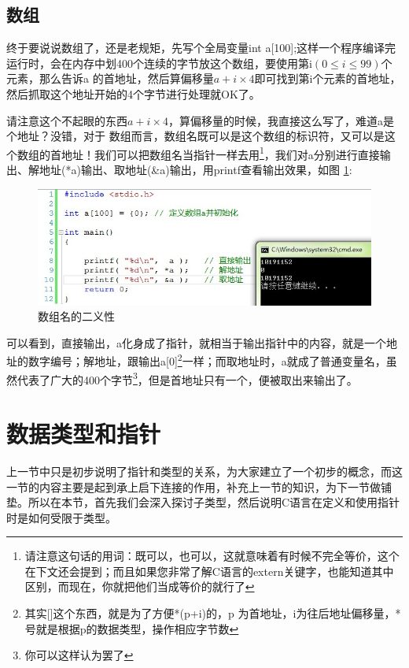 \documentclass[11pt,twoside,a4paper,titlepage]{article}	%
\newcommand{\kw}[1]{\textcolor[rgb]{0.0,0.0,0.63}{ #1}}
\begin{document}
\subsection{数组}
终于要说说数组了，还是老规矩，先写个全局变量int a[100];这样一个程序编译完运行时，会在内存中划400个连续的字节放这个数组，要使用第i$(0\leqslant i \leqslant 99)$个元素，那么告诉a 的首地址，然后算偏移量$a+i\times 4$即可找到第i个元素的首地址，然后抓取这个地址开始的4个字节进行处理就OK了。

请注意这个不起眼的东西$a+i\times 4$，算偏移量的时候，我直接这么写了，难道a是个地址？没错，对于\kw{数组而言，数组名既可以是这个数组的标识符，又可以是这个数组的首地址！我们可以把数组名当指针一样去用}\footnote{请注意这句话的用词：既可以，也可以，这就意味着有时候不完全等价，这个在下文还会提到；而且如果您非常了解C语言的extern关键字，也能知道其中区别，而现在，你就把他们当成等价的就行了}，我们对a分别进行直接输出、解地址(*a)输出、取地址(\&a)输出，用printf查看输出效果，如图 \ref{fig:arryadd_01}:

\begin{figure}[H]
\centering
\includegraphics[scale=.5]{../src/arryadd_01.jpg}
\caption{数组名的二义性}
\label{fig:arryadd_01}
\end{figure}

可以看到，直接输出，a化身成了指针，就相当于输出指针中的内容，就是一个地址的数字编号；解地址，跟输出a[0]\footnote{其实[]这个东西，就是为了方便*(p+i)的，p 为首地址，i为往后地址偏移量，*号就是根据p的数据类型，操作相应字节数}一样；而取地址时，a就成了普通变量名，虽然代表了广大的400个字节\footnote{你可以这样认为罢了}，但是首地址只有一个，便被取出来输出了。

\newpage
\section{数据类型和指针}
上一节中只是初步说明了指针和类型的关系，为大家建立了一个初步的概念，而这一节的内容主要是起到承上启下连接的作用，补充上一节的知识，为下一节做铺垫。所以在本节，首先我们会深入探讨子类型，然后说明C语言在定义和使用指针时是如何受限于类型。
\end{document}
